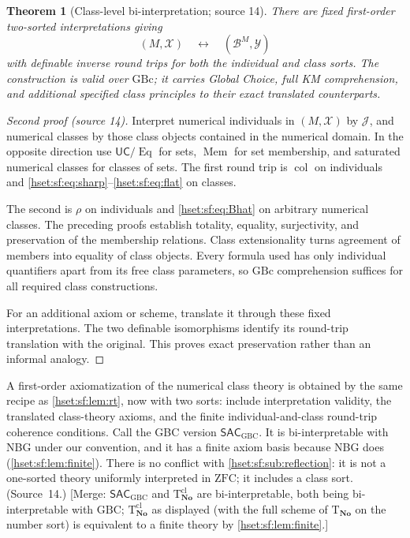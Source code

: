 \documentclass[11pt,letterpaper]{article}
\newtheorem{theorem}{Theorem}[section]
\theoremstyle{definition}
\theoremstyle{remark}
\newcommand{\No}{\mathbf{No}}
\newcommand{\B}{\mathcal B}
\newcommand{\J}{\mathcal J}
\newcommand{\ZFC}{\mathrm{ZFC}}
\newcommand{\GBc}{\mathrm{GBc}}
\newcommand{\GBC}{\mathrm{GBC}}
\newcommand{\Eqc}{\operatorname{Eq}}
\newcommand{\Memc}{\operatorname{Mem}}
\newcommand{\UC}{\mathsf{UC}}
\newcommand{\Tth}{\mathrm{T}}
\begin{document}
\begin{theorem}[Class-level bi-interpretation; source 14]\label{hset:sf:thm:classbi}
There are fixed first-order two-sorted interpretations giving
\[
 (M,\mathcal X)\quad\longleftrightarrow\quad(\B^M,\mathcal Y)
\]
with definable inverse round trips for both the individual and class sorts. The
construction is valid over $\GBc$; it carries Global Choice, full KM comprehension,
and additional specified class principles to their exact translated counterparts.
\end{theorem}
\begin{proof}[Second proof (source 14)]
Interpret numerical individuals in $(M,\mathcal X)$ by $\J$, and numerical classes
by those class objects contained in the numerical domain. In the opposite direction
use $\UC/{\Eqc}$ for sets, $\Memc$ for set membership, and saturated numerical
classes for classes of sets. The first round trip is $\operatorname{col}$ on
individuals and \eqref{hset:sf:eq:sharp}--\eqref{hset:sf:eq:flat} on classes.

The second is $\rho$ on individuals and \eqref{hset:sf:eq:Bhat} on arbitrary
numerical classes. The preceding proofs establish totality, equality, surjectivity,
and preservation of the membership relations. Class extensionality turns agreement
of members into equality of class objects. Every formula used has only individual
quantifiers apart from its free class parameters, so $\GBc$ comprehension suffices
for all required class constructions.

For an additional axiom or scheme, translate it through these fixed
interpretations. The two definable isomorphisms identify its round-trip translation
with the original. This proves exact preservation rather than an informal analogy.
\end{proof}

A first-order axiomatization of the numerical class theory is obtained by the same
recipe as \cref{hset:sf:lem:rt}, now with two sorts: include interpretation
validity, the translated class-theory axioms, and the finite individual-and-class
round-trip coherence conditions. Call the GBC version $\mathsf{SAC}_{\GBC}$. It is
bi-interpretable with NBG under our convention, and it has a finite axiom basis
because NBG does (\cref{hset:sf:lem:finite}). There is no conflict with
\cref{hset:sf:sub:reflection}: it is not a one-sorted theory uniformly interpreted
in $\ZFC$; it includes a class sort. (Source~14.) [Merge: $\mathsf{SAC}_{\GBC}$ and
$\Tth^{\mathrm{cl}}_{\No}$ are bi-interpretable, both being bi-interpretable with
$\GBC$; $\Tth^{\mathrm{cl}}_{\No}$ as displayed (with the full scheme of $\Tth_{\No}$
on the number sort) is equivalent to a finite theory by \cref{hset:sf:lem:finite}.]
\end{document}
